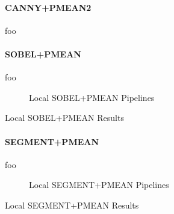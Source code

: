 \paragraph{CANNY+PMEAN2}

foo

\paragraph{SOBEL+PMEAN}

foo

\begin{figure}[h]
    \centering
    
    \caption[Local SOBEL+PMEAN Pipelines]{
        Local SOBEL+PMEAN Pipelines
    }
    \label{fig:pipeline_local_luma_sobel_pmean}
\end{figure}

\begin{table}[h]
    \centering
    
    \caption[Local SOBEL+PMEAN Results]{
        Local SOBEL+PMEAN Results
    }
    \label{tab:results_local_luma_sobel_pmean}
\end{table}

\paragraph{SEGMENT+PMEAN}

foo

\begin{figure}[h]
    \centering
    
    \caption[Local SEGMENT+PMEAN Pipelines]{
        Local SEGMENT+PMEAN Pipelines
    }
    \label{fig:pipeline_local_luma_segment_pmean}
\end{figure}

\begin{table}[h]
    \centering
    
    \caption[Local SEGMENT+PMEAN Results]{
        Local SEGMENT+PMEAN Results
    }
    \label{tab:results_local_luma_segment_pmean}
\end{table}
